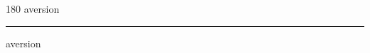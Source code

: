 
\begin{frame}
\begin{center}
\begin{turn}{180}
{\fontsize{2.5cm}{1em}\selectfont aversion}
\end{turn}
\vspace{1em}\par  
\hrule
\vspace{1em}\par  
{\fontsize{2.5cm}{1em}\selectfont aversion}
\end{center}
\end{frame}
